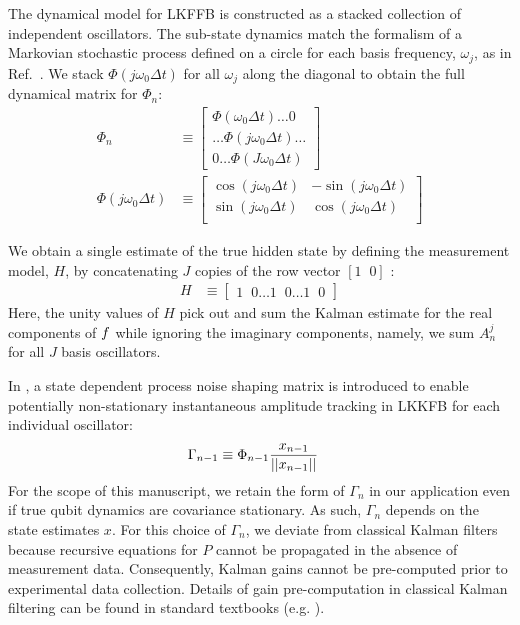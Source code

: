 \documentclass[pra, reprint]{revtex4-1}
\begin{document}
The dynamical model for LKFFB is constructed as a stacked collection of independent oscillators. The sub-state dynamics match the formalism of a Markovian stochastic process defined on a circle for each basis frequency, $\omega_j$, as in Ref.~\cite{karlin2012first}. We stack $\Phi(j \omega_0 \Delta t) $ for all $\omega_j$ along the diagonal to obtain the full dynamical matrix for $\Phi_n$:
\begin{align}
\Phi_{n} & \equiv \begin{bmatrix} 
\Phi(\omega_0 \Delta t)\hdots 0  \\ 
 \hdots \Phi(j\omega_0 \Delta t) \hdots \\
0 \hdots \Phi(J \omega_0 \Delta t)  \end{bmatrix}\\ 
\Phi(j \omega_0 \Delta t) &\equiv \begin{bmatrix} \cos(j \omega_0 \Delta t) & -\sin(j \omega_0 \Delta t) \\ \sin(j \omega_0 \Delta t) & \cos(j \omega_0 \Delta t) \\ \end{bmatrix} \label{eqn:ap_approxSP:LKFFB_Phi} 
\end{align}

We obtain a single estimate of the true hidden state by defining the measurement model, $H$, by concatenating $J$ copies of the row vector $[1\;\;0]$ :
\begin{align}
H & \equiv \begin{bmatrix} 1\;\;0 \hdots 1\;\;0 \hdots 1\;\;0 \end{bmatrix}
\end{align}
Here, the unity values of $H$ pick out and sum the Kalman estimate for the real components of $f$ while ignoring the imaginary components, namely, we sum $A^{j}_{n}$ for all $J$ basis oscillators.

In \cite{livska2007}, a state dependent process noise shaping matrix is introduced to enable potentially non-stationary instantaneous amplitude tracking in LKKFB for each individual oscillator: 
\begin{align}
\Gamma_{n-1} &\equiv \Phi_{n-1}\frac{x_{n-1}}{||x_{n-1}||}
\end{align}
For the scope of this manuscript, we retain the form of $\Gamma_{n}$ in our application even if true qubit dynamics are covariance stationary. As such, $\Gamma_{n}$ depends on the state estimates $x$. For this choice of $\Gamma_{n}$, we deviate from classical Kalman filters because recursive equations for $P$ cannot be propagated in the absence of measurement data. Consequently, Kalman gains cannot be pre-computed prior to experimental data collection. Details of gain pre-computation in classical Kalman filtering can be found in standard textbooks (e.g. \cite{grewal2001theory}).
\end{document}
